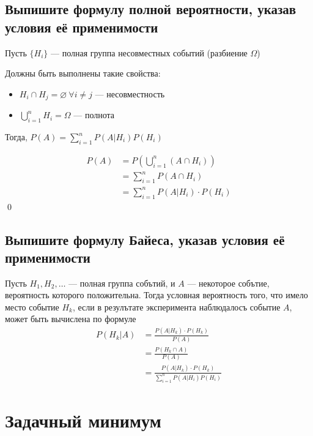 \documentclass{article}
\begin{document}
\subsection{Выпишите формулу полной вероятности, указав условия её применимости}
Пусть $\{H_i\}$ — полная группа несовместных событий (разбиение $\Omega$)

Должны быть выполнены такие свойства:
\begin{itemize}
    \item $H_i\cap H_j=\varnothing\ \forall i\ne j$ — несовместность\\[1mm]
    \item $\displaystyle\bigcup_{i=1}^{n}H_i=\Omega$ — полнота
\end{itemize}

\theorem Тогда, $P(A)=\sum_{i=1}^{n}P(A|H_i)P(H_i)$

\proof
\begin{equation*}
    \begin{aligned}
        P(A)&=P\left(\bigcup_{i=1}^{n}(A\cap H_i)\right)\\
        &=\sum_{i=1}^{n}P(A\cap H_i)\\
        &=\sum_{i=1}^{n} P(A|H_i)\cdot P(H_i)
    \end{aligned}
\end{equation*}\qed

\subsection{Выпишите формулу Байеса, указав условия её применимости}
Пусть $H_1, H_2, \ldots$ — полная группа собътий, и $A$ — некоторое собътие, вероятность которого положительна. Тогда условная вероятность того, что имело место событие $H_k$, если в резулътате эксперимента наблюдалосъ событие $A$, может быть вычислена по формуле
\begin{equation*}
    \begin{aligned}
        P(H_k|A)&=\frac{P(A|H_k)\cdot P(H_k)}{P(A)}\\
        &=\frac{P(H_k\cap A)}{P(A)}\\
        &=\frac{P(A|H_k)\cdot P(H_k)}{\sum_{i=1}^{n} P(A|H_i)P(H_i)}
    \end{aligned}
\end{equation*}

\newpage
\section{Задачный минимум}
\end{document}
